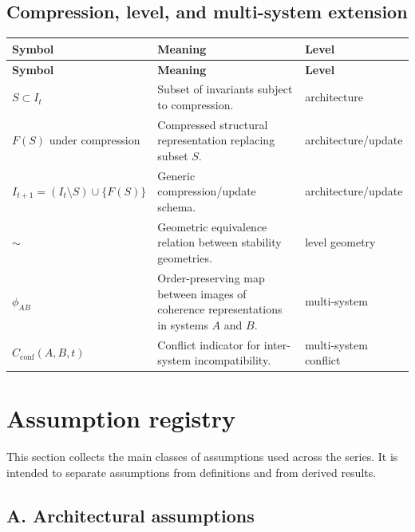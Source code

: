 \documentclass[11pt,a4paper]{article}
\begin{document}
	\subsection{Compression, level, and multi-system extension}
	
	\begin{longtable}{>{\RaggedRight\arraybackslash}p{}
			>{\RaggedRight\arraybackslash}p{}
			>{\RaggedRight\arraybackslash}p{}}
		\toprule
		\textbf{Symbol} & \textbf{Meaning} & \textbf{Level} \\
		\midrule
		\endfirsthead
		\toprule
		\textbf{Symbol} & \textbf{Meaning} & \textbf{Level} \\
		\midrule
		\endhead
		
		$S \subset I_t$ & Subset of invariants subject to compression. & architecture \\
		
		$F(S)$ under compression & Compressed structural representation replacing subset $S$. & architecture/update \\
		
		$I_{t+1} = (I_t \setminus S)\cup \{F(S)\}$ & Generic compression/update schema. & architecture/update \\
		
		$\sim$ & Geometric equivalence relation between stability geometries. & level geometry \\
		
		$\phi_{AB}$ & Order-preserving map between images of coherence representations in systems $A$ and $B$. & multi-system \\
		
		$C_{\mathrm{conf}}(A,B,t)$ & Conflict indicator for inter-system incompatibility. & multi-system conflict \\
		
		\bottomrule
	\end{longtable}
	
	\section{Assumption registry}
	
	This section collects the main classes of assumptions used across the series. It is intended to
	separate assumptions from definitions and from derived results.
	
	\subsection{A. Architectural assumptions}
	
\end{document}
